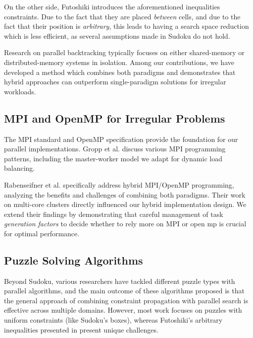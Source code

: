 On the other side, Futoshiki introduces the aforementioned inequalities constraints. Due to the fact that they are placed \textit{between} cells, and due to the fact that their position is \textit{arbitrary}, this leads to having a search space reduction which is less efficient, as several assumptions made in Sudoku do not hold.

Research on parallel backtracking typically focuses on either shared-memory or distributed-memory systems in isolation. Among our contributions, we have developed a method which combines both paradigms and demonstrates that hybrid approaches can outperform single-paradigm solutions for irregular workloads.

\subsection{MPI and OpenMP for Irregular Problems}
\label{subsec:mpi_omp_irregular_problems}
The MPI standard \cite{MPIForum2021} and OpenMP specification \cite{OpenMP2020} provide the foundation for our parallel implementations. Gropp et al. \cite{Gropp1999} discuss various MPI programming patterns, including the master-worker model we adapt for dynamic load balancing.

Rabenseifner et al. \cite{Rabenseifner2009} specifically address hybrid MPI/OpenMP programming, analyzing the benefits and challenges of combining both paradigms. Their work on multi-core clusters directly influenced our hybrid implementation design. We extend their findings by demonstrating that careful management of task \textit{generation factors} to decide whether to rely more on MPI or open mp is crucial for optimal performance.

\subsection{Puzzle Solving Algorithms}
\label{subsec:puzzle_solving_algorithms}
Beyond Sudoku, various researchers have tackled different puzzle types with parallel algorithms, and the main outcome of these algorithms proposed is that the general approach of combining constraint propagation with parallel search is effective across multiple domains. However, most work focuses on puzzles with uniform constraints (like Sudoku's boxes), whereas Futoshiki's arbitrary inequalities presented in  present unique challenges.

